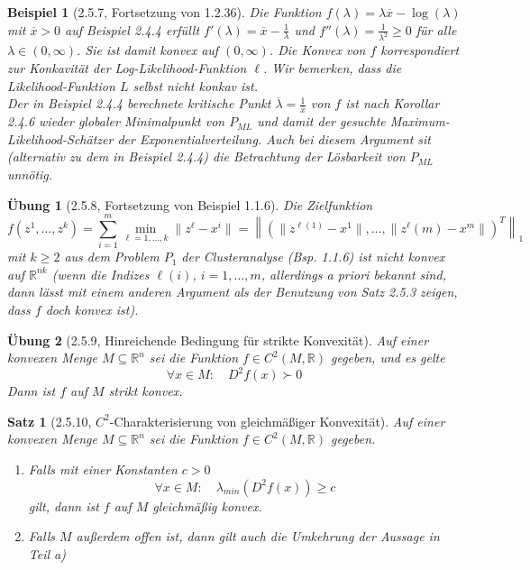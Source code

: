 \documentclass[12pt]{extreport} %
\newcommand{\R}{\mathbb{R}}
\theoremstyle{named}
\theoremstyle{nnamed}
\theoremstyle{itshape}
\newtheorem*{satz}{Satz}
\theoremstyle{normal}
\newtheorem*{beispiel}{Beispiel}
\newtheorem*{uebung}{Übung}
\begin{document}
\begin{beispiel}[2.5.7, Fortsetzung von 1.2.36]
	Die Funktion $f(\lambda) = \lambda \overline{x} - \log(\lambda)$ mit $\overline{x} > 0$ auf Beispiel 2.4.4 erfüllt $f'(\lambda) = \overline{x} - \frac{1}{\lambda}$ und $f''(\lambda) = \frac{1}{\lambda^2} \geq 0$ für alle $\lambda \in (0, \infty)$. Sie ist damit konvex auf $(0, \infty)$. Die Konvex von $f$ korrespondiert zur Konkavität der Log-Likelihood-Funktion $\ell$. Wir bemerken, dass die Likelihood-Funktion $L$ selbst nicht konkav ist. ~\\
	
	Der in Beispiel 2.4.4 berechnete kritische Punkt $\overline{\lambda} = \frac{1}{\overline{x}}$ von $f$ ist nach Korollar 2.4.6 wieder globaler Minimalpunkt von $P_{ML}$ und damit der gesuchte Maximum-Likelihood-Schätzer der Exponentialverteilung. Auch bei diesem Argument sit (alternativ zu dem in Beispiel 2.4.4) die Betrachtung der Lösbarkeit von $P_{ML}$ unnötig.
\end{beispiel}

\begin{uebung}[2.5.8, Fortsetzung von Beispiel 1.1.6]
	Die Zielfunktion 
	$$ f(z^1, \dotsc, z^k) = \sum_{i=1}^{m} \min_{\ell=1, \dotsc, k} \| z^\ell - x^i \| = \left\| \left( \| z^{\ell(1)} - x^1 \|, \dotsc, \| z^\ell(m) - x^m \| \right)^T \right\|_1 $$	
	mit $k \geq 2$ aus dem Problem $P_1$ der Clusteranalyse (Bsp. 1.1.6) ist nicht konvex auf $\R^{nk}$ (wenn die Indizes $\ell(i)$, $i =1, \dotsc, m$, allerdings a priori bekannt sind, dann lässt mit einem anderen Argument als der Benutzung von Satz 2.5.3 zeigen, dass $f$ doch konvex ist).
\end{uebung}

\begin{uebung}[2.5.9, Hinreichende Bedingung für strikte Konvexität]
	Auf einer konvexen Menge $M \subseteq \R^n$ sei die Funktion $f \in C^2(M, \R)$ gegeben, und es gelte
	$$ \forall x\in M: \quad D^2 f(x) \succ 0 $$
	Dann ist $f$ auf $M$ strikt konvex.	
\end{uebung}

\begin{satz}[2.5.10, $C^2$-Charakterisierung von gleichmäßiger Konvexität]
	Auf einer konvexen Menge $M \subseteq \R^n$ sei die Funktion $f \in C^2(M, \R)$ gegeben.
	\begin{enumerate}
		\item Falls mit einer Konstanten $c > 0$
		$$ \forall x \in M: \quad \lambda_{min} \left( D^2 f(x) \right) \geq c $$
		gilt, dann ist $f$ auf $M$ gleichmäßig konvex.
		\item Falls $M$ außerdem offen ist, dann gilt auch die Umkehrung der Aussage in Teil a)
	\end{enumerate}	
\end{satz}
\end{document}
